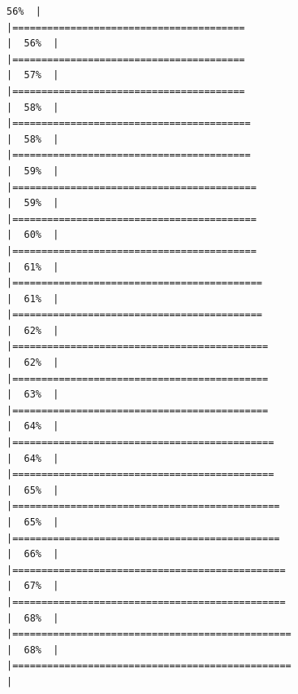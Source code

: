 \documentclass[
  english,
  man,a4paper,mask,floatsintext]{apa6}
\begin{document}
\begin{verbatim}
56%  |                                                                              |========================================                              |  56%  |                                                                              |========================================                              |  57%  |                                                                              |========================================                              |  58%  |                                                                              |=========================================                             |  58%  |                                                                              |=========================================                             |  59%  |                                                                              |==========================================                            |  59%  |                                                                              |==========================================                            |  60%  |                                                                              |==========================================                            |  61%  |                                                                              |===========================================                           |  61%  |                                                                              |===========================================                           |  62%  |                                                                              |============================================                          |  62%  |                                                                              |============================================                          |  63%  |                                                                              |============================================                          |  64%  |                                                                              |=============================================                         |  64%  |                                                                              |=============================================                         |  65%  |                                                                              |==============================================                        |  65%  |                                                                              |==============================================                        |  66%  |                                                                              |===============================================                       |  67%  |                                                                              |===============================================                       |  68%  |                                                                              |================================================                      |  68%  |                                                                              |================================================                      |  
\end{verbatim}
\end{document}
